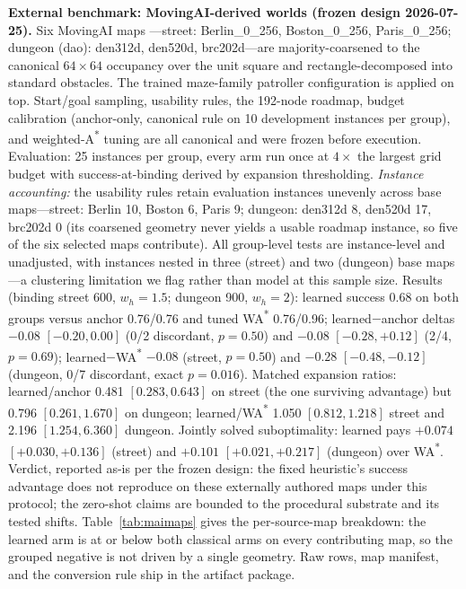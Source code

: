 \documentclass[letterpaper]{article} %
\begin{document}
\textbf{External benchmark: MovingAI-derived worlds (frozen design 2026-07-25).} Six MovingAI maps \citep{sturtevant2012movingai}---street: Berlin\_0\_256, Boston\_0\_256, Paris\_0\_256; dungeon (dao): den312d, den520d, brc202d---are majority-coarsened to the canonical $64{\times}64$ occupancy over the unit square and rectangle-decomposed into standard obstacles. The trained maze-family patroller configuration is applied on top. Start/goal sampling, usability rules, the 192-node roadmap, budget calibration (anchor-only, canonical rule on 10 development instances per group), and weighted-A\textsuperscript{*} tuning are all canonical and were frozen before execution. Evaluation: 25 instances per group, every arm run once at $4\times$ the largest grid budget with success-at-binding derived by expansion thresholding. \emph{Instance accounting:} the usability rules retain evaluation instances unevenly across base maps---street: Berlin 10, Boston 6, Paris 9; dungeon: den312d 8, den520d 17, brc202d 0 (its coarsened geometry never yields a usable roadmap instance, so five of the six selected maps contribute). All group-level tests are instance-level and unadjusted, with instances nested in three (street) and two (dungeon) base maps---a clustering limitation we flag rather than model at this sample size. Results (binding street 600, $w_h{=}1.5$; dungeon 900, $w_h{=}2$): learned success 0.68 on both groups versus anchor 0.76/0.76 and tuned WA\textsuperscript{*} 0.76/0.96; learned$-$anchor deltas $-0.08$ $[-0.20, 0.00]$ (0/2 discordant, $p{=}0.50$) and $-0.08$ $[-0.28, +0.12]$ (2/4, $p{=}0.69$); learned$-$WA\textsuperscript{*} $-0.08$ (street, $p{=}0.50$) and $-0.28$ $[-0.48,-0.12]$ (dungeon, 0/7 discordant, exact $p{=}0.016$). Matched expansion ratios: learned/anchor 0.481 $[0.283, 0.643]$ on street (the one surviving advantage) but 0.796 $[0.261, 1.670]$ on dungeon; learned/WA\textsuperscript{*} 1.050 $[0.812, 1.218]$ street and 2.196 $[1.254, 6.360]$ dungeon. Jointly solved suboptimality: learned pays $+0.074$ $[+0.030, +0.136]$ (street) and $+0.101$ $[+0.021, +0.217]$ (dungeon) over WA\textsuperscript{*}. Verdict, reported as-is per the frozen design: the fixed heuristic's success advantage does not reproduce on these externally authored maps under this protocol; the zero-shot claims are bounded to the procedural substrate and its tested shifts. Table~\ref{tab:maimaps} gives the per-source-map breakdown: the learned arm is at or below both classical arms on every contributing map, so the grouped negative is not driven by a single geometry. Raw rows, map manifest, and the conversion rule ship in the artifact package.
\end{document}
